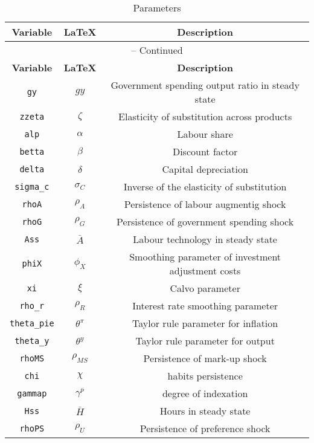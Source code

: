 \begin{center}
\begin{longtable}{ccc}
\caption{Parameters}\\%
\hline%
\multicolumn{1}{c}{\textbf{Variable}} &
\multicolumn{1}{c}{\textbf{\LaTeX}} &
\multicolumn{1}{c}{\textbf{Description}}\\%
\hline\hline%
\endfirsthead
\multicolumn{3}{c}{{\tablename} \thetable{} -- Continued}\\%
\hline%
\multicolumn{1}{c}{\textbf{Variable}} &
\multicolumn{1}{c}{\textbf{\LaTeX}} &
\multicolumn{1}{c}{\textbf{Description}}\\%
\hline\hline%
\endhead
\texttt{gy} & ${gy}$ & Government spending output ratio in steady state\\
\texttt{zzeta} & ${\zeta}$ & Elasticity of substitution across products\\
\texttt{alp} & ${\alpha}$ & Labour share\\
\texttt{betta} & ${\beta}$ & Discount factor\\
\texttt{delta} & ${\delta}$ & Capital depreciation\\
\texttt{sigma\_c} & ${\sigma_{C}}$ & Inverse of the elasticity of substitution\\
\texttt{rhoA} & ${\rho_{A}}$ & Persistence of labour augmentig shock\\
\texttt{rhoG} & ${\rho_{G}}$ & Persistence of government spending shock\\
\texttt{Ass} & ${\bar{A}}$ & Labour technology in steady state\\
\texttt{phiX} & ${\phi_{X}}$ & Smoothing parameter of investment adjustment costs\\
\texttt{xi} & ${\xi}$ & Calvo parameter\\
\texttt{rho\_r} & ${\rho_{R}}$ & Interest rate smoothing parameter\\
\texttt{theta\_pie} & $\theta^{\pi}$ & Taylor rule parameter for inflation\\
\texttt{theta\_y} & $\theta^{y}$ & Taylor rule parameter for output\\
\texttt{rhoMS} & ${\rho_{MS}}$ & Persistence of mark-up shock\\
\texttt{chi} & ${\chi}$ & habits persistence\\
\texttt{gammap} & ${\gamma^{p}}$ & degree of indexation\\
\texttt{Hss} & ${\bar{H}}$ & Hours in steady state\\
\texttt{rhoPS} & ${\rho_{U}}$ & Persistence of preference shock\\

\end{longtable}
\end{center}
